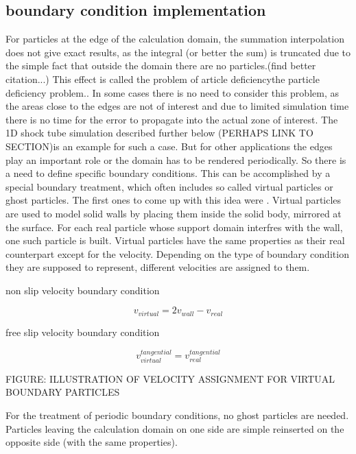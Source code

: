 \documentclass{report}
\begin{document}
\subsection{boundary condition implementation}
\label{sec:boundaryConditionImplementation}
For particles at the edge of the calculation domain, the summation interpolation does not
give exact results, as the integral (or better the sum) is truncated due to
the simple fact that outside the domain there are no
particles.\cite{Liu2003}(find better citation...) This effect is called the
problem of article deficiencythe particle deficiency
problem.\cite{Liu2003}. In some cases there is no need to consider this
problem, as the areas close to the edges are not of interest and due to
limited simulation time there is no time for the error to propagate into the
actual zone of interest. The 1D shock tube simulation described further below
(PERHAPS LINK TO SECTION)is an example for such a case.  
But for other applications the edges play an important role or the domain has
to be rendered periodically. So there is a need to define specific boundary
conditions. This can be accomplished by a special boundary treatment, which
often includes so called virtual particles or ghost
particles\cite{Liu2003}. The first ones to come up with this idea were
\cite{LIBERSKY1993}. Virtual particles are used to model solid walls by
placing them inside the solid body, mirrored at the surface. For each real
particle whose support domain interfres with the wall, one such particle is
built. Virtual particles have the same properties as their real counterpart
except for the velocity. Depending on the type of boundary condition they are
supposed to represent, different velocities are assigned to them.\cite{Hu2006}

non slip velocity boundary condition

\begin{equation}
v_{virtual}=2v_{wall}-v_{real}
\end{equation}

free slip velocity boundary condition

\begin{equation}
v_{virtual}^{tangential}=v_{real}^{tangential}
\end{equation}

FIGURE: ILLUSTRATION OF VELOCITY ASSIGNMENT FOR VIRTUAL BOUNDARY PARTICLES

For the treatment of periodic boundary conditions, no ghost particles are
needed. Particles leaving the calculation domain on one side are simple
reinserted on the opposite side (with the same properties).
\end{document}
